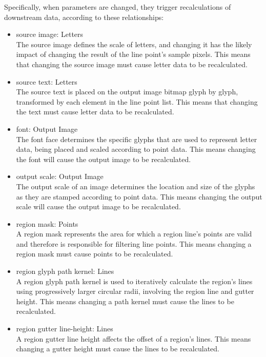 Specifically, when parameters are changed, they trigger recalculations of downstream data, according to these relationships:
\begin{itemize}
      \item source image: Letters \\
            The source image defines the scale of letters, and changing it has the likely impact of changing the result of the line point's sample pixels.
            This means that changing the source image must cause letter data to be recalculated.

      \item source text: Letters \\
            The source text is placed on the output image bitmap glyph by glyph, transformed by each element in the line point list.
            This means that changing the text must cause letter data to be recalculated.

      \item font: Output Image \\
            The font face determines the specific glyphs that are used to represent letter data, being placed and scaled according to point data.
            This means changing the font will cause the output image to be recalculated.

      \item output scale: Output Image \\
            The output scale of an image determines the location and size of the glyphs as they are stamped according to point data.
            This means changing the output scale will cause the output image to be recalculated.

      \item region mask: Points \\
            A region mask represents the area for which a region line's points are valid and therefore is responsible for filtering line points.
            This means changing a region mask must cause points to be recalculated.

      \item region glyph path kernel: Lines \\
            A region glyph path kernel is used to iteratively calculate the region's lines using progressively larger circular radii, involving the region line and gutter height.
            This means changing a path kernel must cause the lines to be recalculated.

      \item region gutter line-height: Lines \\
            A region gutter line height affects the offset of a region's lines.
            This means changing a gutter height must cause the lines to be recalculated.


\end{itemize}
